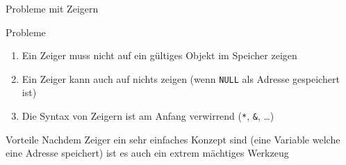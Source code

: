 \documentclass[presentation]{beamer}
\begin{document}
\begin{frame}[label={sec:org9bd9d8e},fragile]{Probleme mit Zeigern}
 \begin{block}{Probleme}
\begin{enumerate}
\item Ein Zeiger muss nicht auf ein gültiges Objekt im Speicher zeigen
\item Ein Zeiger kann auch auf nichts zeigen (wenn {\color{solarizedYellow}\verb!NULL!} als Adresse
gespeichert ist)
\item Die Syntax von Zeigern ist am Anfang verwirrend ({\color{solarizedYellow}\verb!*!}, {\color{solarizedYellow}\verb!&!}, \ldots{})
\end{enumerate}
\end{block}
\begin{block}{Vorteile}
Nachdem Zeiger ein sehr einfaches Konzept sind (eine Variable welche
eine Adresse speichert) ist es auch ein extrem mächtiges Werkzeug
\end{block}
\end{frame}
\end{document}
